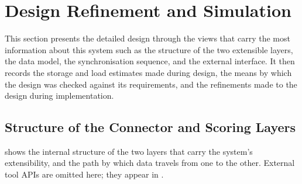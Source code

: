 \section{Design Refinement and Simulation}
\label{sec:detailed-design}

This section presents the detailed design through the views that carry the most
information about this system such as the structure of the two extensible layers, the
data model, the synchronisation sequence, and the external interface. It then
records the storage and load estimates made during design, the means by which the
design was checked against its requirements, and the refinements made to the
design during implementation.

\subsection{Structure of the Connector and Scoring Layers}
\label{subsec:connector-scoring-structure}

 shows the internal structure of the two layers that
carry the system's extensibility, and the path by which data travels from one to
the other. External tool APIs are omitted here; they appear in
.

